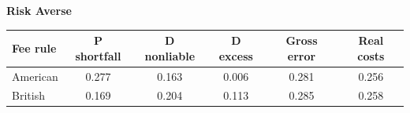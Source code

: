 \documentclass[10pt,border=5pt,varwidth=17cm]{standalone}
\begin{document}
\begingroup
\small
\setlength{\tabcolsep}{5pt}
\renewcommand{\arraystretch}{1.20}
\noindent\textbf{Risk Averse}\par\smallskip
\noindent\begin{tabularx}{\linewidth}{@{}>{\raggedright\arraybackslash}Xccccc@{}}
\toprule
\textbf{Fee rule} & \textbf{P shortfall} & \textbf{D nonliable} & \textbf{D excess} & \textbf{Gross error} & \textbf{Real costs} \\
\midrule
American & 0.277 & 0.163 & 0.006 & 0.281 & 0.256 \\
British & 0.169 & 0.204 & 0.113 & 0.285 & 0.258 \\
\bottomrule\end{tabularx}\par\medskip
\endgroup
\end{document}
